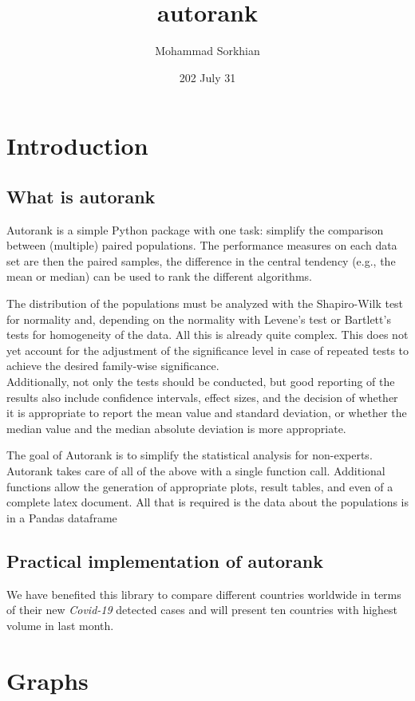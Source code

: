 \documentclass[12pt, letterpaper, twoside]{report}
\title{\textbf{autorank}}
\author{Mohammad Sorkhian}
\date{202 July 31}
\begin{document}
\maketitle

\chapter{Introduction}
\section{What is \textbf{autorank}}
Autorank is a simple Python package with one task: simplify the comparison between (multiple) paired populations. The performance measures on each data set are then the paired samples, the difference in the central tendency (e.g., the mean or median) can be used to rank the different algorithms.

The distribution of the populations must be analyzed with the Shapiro-Wilk test for normality and, depending on the normality with Levene's test or Bartlett's tests for homogeneity of the data. All this is already quite complex. This does not yet account for the adjustment of the significance level in case of repeated tests to achieve the desired family-wise significance. \\Additionally, not only the tests should be conducted, but good reporting of the results also include confidence intervals, effect sizes, and the decision of whether it is appropriate to report the mean value and standard deviation, or whether the median value and the median absolute deviation is more appropriate.

The goal of Autorank is to simplify the statistical analysis for non-experts. Autorank takes care of all of the above with a single function call. Additional functions allow the generation of appropriate plots, result tables, and even of a complete latex document. All that is required is the data about the populations is in a Pandas dataframe

\section{Practical implementation of \textbf{autorank}}
We have benefited this library to compare different countries worldwide in terms of their new \textit{Covid-19} detected cases and will present ten countries with highest volume in last month.

\chapter{Graphs}
\end{document}
